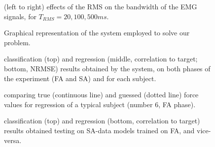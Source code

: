 \documentclass[10pt]{bmc_article}
\def\texttt{[image: ]}
\newenvironment{bmcformat}{\begin{raggedright}\baselineskip20pt\sloppy\setboolean{publ}{false}}{\end{raggedright}\baselineskip20pt\sloppy}
\begin{document}
\begin{bmcformat}
\begin{figure}[!ht] \centering
  \caption{(left to right) effects of the RMS on the bandwidth of the EMG
    signals, for $T_{RMS} = 20, 100, 500ms$.}
  \label{fig:RMSs}
\end{figure}

\begin{figure}[!ht] \centering
  \caption{Graphical representation of the system employed to solve our problem.}
  \label{fig:Algorithm}
\end{figure}

\begin{figure}[!ht] \centering
  \caption{classification (top) and regression (middle, correlation to target;
    bottom, NRMSE) results obtained
    by the system, on both phases of the experiment (FA and SA) and
    for each subject.}
  \label{fig:results}
\end{figure}

\begin{figure}[!ht] \centering
  \caption{comparing true (continuous line) and guessed (dotted line) force values for regression of a
    typical subject (number $6$, FA phase).}
  \label{fig:examples}
\end{figure}

\begin{figure}[!ht] \centering
   \caption{classification (top) and regression (bottom, correlation to target)
      results obtained testing on SA-data models trained on FA, and vice-versa.}
  \label{fig:2on1}
\end{figure}


\end{bmcformat}
\end{document}

